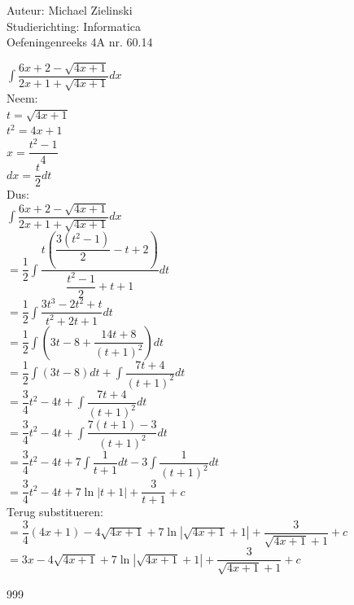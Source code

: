 \documentclass[a4paper]{article}
\begin{document}
  
\noindent \large Auteur: Michael Zielinski \\
\noindent \large Studierichting: Informatica\\
\noindent \large Oefeningenreeks 4A nr. 60.14\\

\medskip

\normalsize

$ \displaystyle\int\dfrac{6x+2-\sqrt{4x+1}}{2x+1+\sqrt{4x+1}}dx $ \\

Neem: \\

$ t = \sqrt{4x+1} $ \\

$ t^2 = 4x+1 $ \\

$ x = \dfrac{t^2-1}{4} $ \\

$ dx = \dfrac{t}{2}dt $ \\

Dus: \\

$ \displaystyle\int\dfrac{6x+2-\sqrt{4x+1}}{2x+1+\sqrt{4x+1}}dx $ \\

$ = \dfrac{1}{2}\displaystyle\int
\dfrac{t\left(\dfrac{3(t^2-1)}{2}-t+2\right)}
{\dfrac{t^2-1}{2}+t+1}dt $ \\

$ = \dfrac{1}{2}\displaystyle\int
\dfrac{3t^3-2t^2+t}{t^2+2t+1}dt $ \\

$ = \dfrac{1}{2}\displaystyle\int
\left(3t-8+\dfrac{14t+8}{(t+1)^2}\right)dt $ \\

$ = \dfrac{1}{2}\displaystyle\int (3t-8)dt
+ \displaystyle\int\dfrac{7t+4}{(t+1)^2}dt $ \\

$ = \dfrac{3}{4}t^2-4t
+ \displaystyle\int\dfrac{7t+4}{(t+1)^2}dt $ \\

$ = \dfrac{3}{4}t^2-4t
+ \displaystyle\int\dfrac{7(t+1)-3}{(t+1)^2}dt $ \\

$ = \dfrac{3}{4}t^2-4t
+ 7\displaystyle\int\dfrac{1}{t+1}dt
- 3\displaystyle\int\dfrac{1}{(t+1)^2}dt $ \\

$ = \dfrac{3}{4}t^2-4t
+ 7\ln|t+1| + \dfrac{3}{t+1} + c $ \\

Terug substitueren: \\

$ = \dfrac{3}{4}(4x+1)-4\sqrt{4x+1}
+ 7\ln|\sqrt{4x+1}+1|
+ \dfrac{3}{\sqrt{4x+1}+1} + c $ \\

$ = 3x -4\sqrt{4x+1}
+ 7\ln|\sqrt{4x+1}+1|
+ \dfrac{3}{\sqrt{4x+1}+1} + c $ \\

\begin{thebibliography}{999}
\end{thebibliography}
\end{document}
